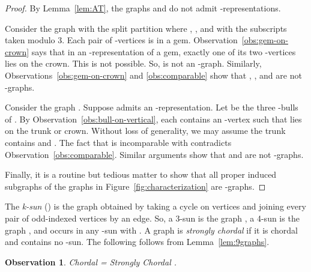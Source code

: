 \documentclass[11pt,3p,times]{elsarticle}
\newenvironment{myproof}{\begin{proof}}{\end{proof}}
\newcommand{\proofBox}{\hfill }
\newtheorem{observation}[theorem]{Observation}
\begin{document}
\begin{myproof}
By Lemma~\ref{lem:AT}, the graphs  and  do not
admit -representations.

Consider the graph  with the
split partition  where , , and  with the
subscripts taken modulo 3. Each pair of -vertices is in a gem.
Observation~\ref{obs:gem-on-crown} says that in an -representation
of a gem, exactly one of its two -vertices lies on the crown.  This
is not possible. So,  is not an -graph. Similarly,
Observations~\ref{obs:gem-on-crown} and
\ref{obs:comparable} show that , , and
 are not -graphs.

Consider the graph . Suppose
 admits an -representation. Let  be the
three -bulls of . By
Observation~\ref{obs:bull-on-vertical}, each  contains an
-vertex  such that  lies on the trunk or crown.
Without loss of generality, we may assume the trunk contains 
and . The fact that  is incomparable with 
contradicts Observation~\ref{obs:comparable}. Similar arguments
show that  and  are not -graphs.

Finally, it is a
routine but tedious matter to show that all proper induced
subgraphs of the graphs in Figure~\ref{fig:characterization} are
-graphs.
\end{myproof}


The {\em k-sun} () is the graph obtained by taking a
cycle on  vertices and joining every pair of odd-indexed vertices by an edge.
So, a 3-sun is the graph , a 4-sun is the graph , and
 occurs in any -sun with . A graph is {\em
strongly chordal} if it is chordal and contains no -sun. The
following follows from Lemma~\ref{lem:9graphs}.
\begin{observation}
Chordal   = Strongly Chordal . \proofBox
\end{observation}
\end{document}
